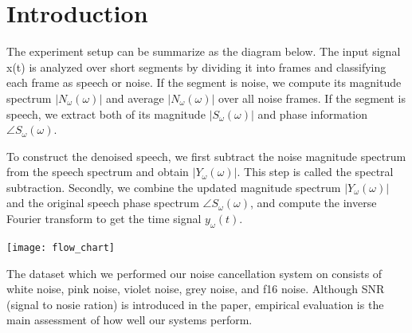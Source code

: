 \documentclass[journal]{IEEEtran}
\begin{document}
\section{Introduction}
\begin{flushleft}
The experiment setup can be summarize as the diagram below. The input signal x(t) is analyzed over short segments by dividing it into frames and classifying each frame as speech or noise. If the segment is noise, we compute its magnitude spectrum $|N_\omega(\omega)|$ and average $|N_\omega(\omega)|$ over all noise frames. If the segment is speech, we extract both of its magnitude $|S_\omega(\omega)|$ and phase information $\angle S_\omega(\omega)$.\\
\end{flushleft}
\begin{flushleft}
To construct the denoised speech, we first subtract the noise magnitude spectrum from the speech spectrum and obtain $|Y_\omega(\omega)|$. This step is called the spectral subtraction. Secondly, we combine the updated magnitude spectrum $|Y_\omega(\omega)|$ and the original speech phase spectrum $\angle S_\omega(\omega)$, and compute the inverse Fourier transform to get the time signal $y_\omega(t)$.\\
\end{flushleft}
\centering
\texttt{[image: flow\_chart]}
\begin{flushleft}
The dataset which we performed our noise cancellation system on consists of white noise, pink noise, violet noise, grey noise, and f16 noise. Although SNR (signal to nosie ration) is introduced in the paper, empirical evaluation is the main assessment of how well our systems perform.
\end{flushleft}
\end{document}
